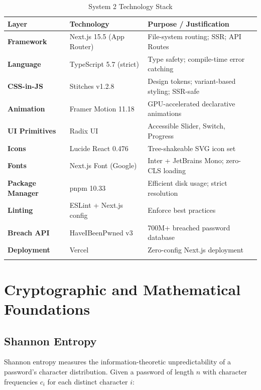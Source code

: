 \documentclass[12pt,a4paper]{article}
\begin{document}
\begin{longtable}{>{\bfseries}p{3.2cm} p{3.5cm} p{6cm}}
\toprule
\textbf{Layer} & \textbf{Technology} & \textbf{Purpose / Justification} \\
\midrule
\endhead

Framework       & Next.js 15.5 (App Router) & File-system routing; SSR; API Routes \\
Language        & TypeScript 5.7 (strict)    & Type safety; compile-time error catching \\
CSS-in-JS       & Stitches v1.2.8            & Design tokens; variant-based styling; SSR-safe \\
Animation       & Framer Motion 11.18        & GPU-accelerated declarative animations \\
UI Primitives   & Radix UI                   & Accessible Slider, Switch, Progress \\
Icons           & Lucide React 0.476         & Tree-shakeable SVG icon set \\
Fonts           & Next.js Font (Google)      & Inter + JetBrains Mono; zero-CLS loading \\
Package Manager & pnpm 10.33                 & Efficient disk usage; strict resolution \\
Linting         & ESLint + Next.js config    & Enforce best practices \\
Breach API      & HaveIBeenPwned v3          & 700M+ breached password database \\
Deployment      & Vercel                     & Zero-config Next.js deployment \\

\bottomrule
\caption{System 2 Technology Stack}
\end{longtable}

\section{Cryptographic and Mathematical Foundations}

\subsection{Shannon Entropy}

Shannon entropy measures the information-theoretic unpredictability of a
password's character distribution. Given a password of length $n$ with
character frequencies $c_i$ for each distinct character $i$:
\end{document}
